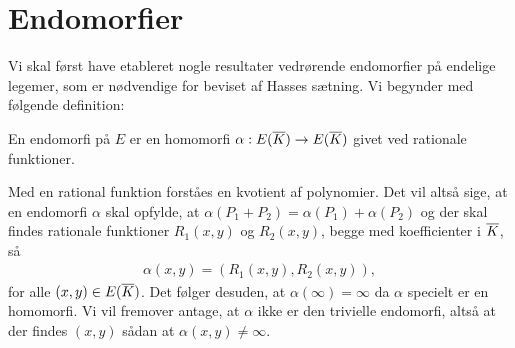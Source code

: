 \section{Endomorfier}
Vi skal først have etableret nogle resultater vedrørende endomorfier på endelige legemer, som
er nødvendige for beviset af Hasses sætning. Vi begynder med følgende definition:

\begin{definition}
En endomorfi på $E$ er en homomorfi $\alpha : E(\overline{K}) \to E(\overline{K})$ givet
ved rationale funktioner.
\end{definition}

Med en rational funktion forståes en kvotient af polynomier. Det vil altså sige, at 
en endomorfi $\alpha$ skal opfylde, at $\alpha(P_1 + P_2) = \alpha(P_1) + \alpha(P_2)$ 
og der skal findes rationale 
funktioner $R_1(x, y)$ og $R_2(x, y)$, begge med koefficienter i $\overline{K}$, så
\begin{align*}
	\alpha(x, y) = (R_1(x, y), R_2(x, y)),
\end{align*}
for alle $(x, y) \in E(\overline{K})$. Det følger desuden, at $\alpha(\infty) = \infty$ da 
$\alpha$ specielt er en homomorfi. Vi vil fremover antage, at $\alpha$ ikke er den 
trivielle endomorfi, altså at der findes $(x, y)$ sådan at $\alpha(x, y) \neq \infty$.

